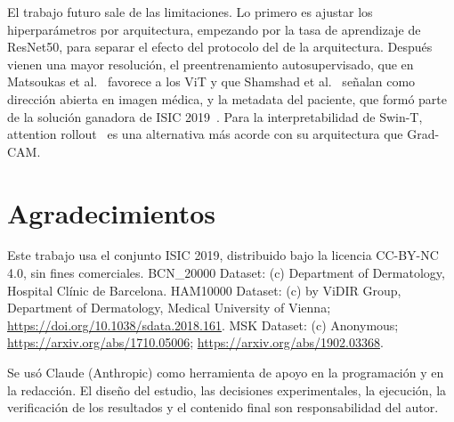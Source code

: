 \documentclass[conference]{IEEEtran}
\begin{document}
El trabajo futuro sale de las limitaciones. Lo primero es ajustar los hiperparámetros por arquitectura, empezando por la tasa de aprendizaje de ResNet50, para separar el efecto del protocolo del de la arquitectura. Después vienen una mayor resolución, el preentrenamiento autosupervisado, que en Matsoukas et al.~\cite{matsoukas2023pretrained} favorece a los ViT y que Shamshad et al.~\cite{shamshad2023transformers} señalan como dirección abierta en imagen médica, y la metadata del paciente, que formó parte de la solución ganadora de ISIC 2019~\cite{gessert2020isic}. Para la interpretabilidad de Swin-T, attention rollout~\cite{abnar2020attention} es una alternativa más acorde con su arquitectura que Grad-CAM.

\section*{Agradecimientos}

Este trabajo usa el conjunto ISIC 2019, distribuido bajo la licencia CC-BY-NC 4.0, sin fines comerciales. BCN\_20000 Dataset: (c) Department of Dermatology, Hospital Clínic de Barcelona. HAM10000 Dataset: (c) by ViDIR Group, Department of Dermatology, Medical University of Vienna; \url{https://doi.org/10.1038/sdata.2018.161}. MSK Dataset: (c) Anonymous; \url{https://arxiv.org/abs/1710.05006}; \url{https://arxiv.org/abs/1902.03368}.

Se usó Claude (Anthropic) como herramienta de apoyo en la programación y en la redacción. El diseño del estudio, las decisiones experimentales, la ejecución, la verificación de los resultados y el contenido final son responsabilidad del autor.



\end{document}
